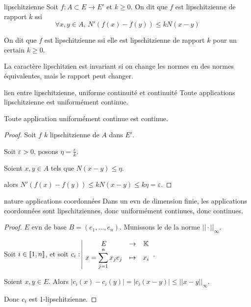 \begin{definition}{lipschitzienne}{}
    Soit $f : A \subset E \to E'$ et $k \geqslant 0$. On dit que $f$ est lipschitzienne 
    de rapport $k$ ssi 
    $$\forall x, y \in A, \, N'(f(x) - f(y)) \leqslant k N(x - y)$$

    On dit que $f$ est lipschitzienne ssi elle est lipschitzienne de rapport $k$ pour un certain $k \geqslant 0$.
\end{definition}


\begin{remarque}
    La caractère lipschitzien est invariant si on change les normes en des normes 
    équivalentes, mais le rapport peut changer.
\end{remarque}

\begin{proposition}{lien entre lipschitzienne, uniforme continuité et continuité}{}
    Toute applications lipschitzienne est uniformément continue. 

    Toute application uniformément continue est continue.
\end{proposition}


\begin{proof}
    Soit $f$ $k$ lipschitzienne de $A$ dans $E'$.

    Soit $\varepsilon > 0$, posons $\eta = \frac \varepsilon k$.

    Soient $x, y \in A$ tels que $N(x - y) \leqslant \eta$.

    alors $N'(f(x) - f(y)) \leqslant k N(x - y) \leqslant k \eta = \varepsilon$.

\end{proof}

\begin{proposition}{nature applications coordonnées}{}
    Dans un evn de dimension finie, les applications coordonnées sont lipschitziennes, 
    donc uniformément continues, donc continues. 
\end{proposition}


\begin{proof}
    $E$ evn de base $B = (e_1, \ldots, e_n)$. Munissons le de la norme $||\cdot||_\infty$.

    Soit $i \in [\![1, n]\!]$, et soit $c_i: \space \begin{array}{|ccc} \displaystyle E & \to & \displaystyle \mathbb{K} \\ \displaystyle x = \sum_{j=1}^n x_j e_j & \mapsto & \displaystyle x_i \end{array}$.

    Soient $x, y \in E$. Alors $|c_i(x) - c_i(y)| = |c_i(x - y) | \leqslant ||x - y||_\infty$.

    Donc $c_i$ est 1-lipschitzienne. 
\end{proof}


